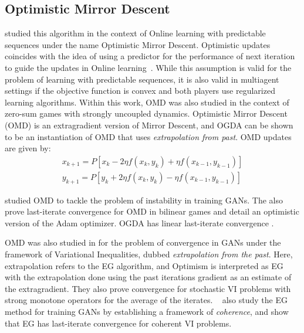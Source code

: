 \subsection{Optimistic Mirror Descent}
\cite{rakhlinOptimization2013} studied this algorithm in the context of Online learning with
predictable sequences under the name Optimistic Mirror Descent.
Optimistic updates coincides with the idea of using a predictor for the performance of next
iteration to guide the updates in Online learning~\cite{}.
While this assumption is valid for the problem of learning with predictable sequences, it is also
valid in multiagent settings if the objective function is convex and both players use regularized
learning algorithms.
Within this work, OMD was also studied in the context of zero-sum games with strongly uncoupled
dynamics.
Optimistic Mirror Descent (OMD) is an extragradient version of Mirror Descent, and OGDA can be
shown to be an instantiation of OMD that uses \textit{extrapolation from past}.
OMD updates are given by:
\begin{equation}
	\label{eqn:omd}
	\begin{split}
		x_{k+1} = P[x_k - 2\eta
				f(x_k, y_k) + \eta f(x_{k-1}, y_{k-1})] \\ y_{k+1} = P[y_k + 2\eta f(x_k, y_k) - \eta f(x_{k-1},
				y_{k-1})]
	\end{split}
\end{equation}

\cite{daskalakisTraining2018} studied OMD
to tackle the problem of instability in training GANs.
The also prove last-iterate convergence for OMD in bilinear games and detail an optimistic version
of the Adam optimizer.
OGDA has linear last-iterate convergence \cite{daskalakisTraining2018}.

OMD was also studied in \cite{gidelVariational2020} for the problem of convergence in GANs under
the framework of Variational Inequalities, dubbed \textit{extrapolation from the past}.
Here, extrapolation refers to the EG algorithm, and Optimism is interpreted as EG with the
extrapolation done using the past iterations gradient as an estimate of the extragradient.
They also prove convergence for stochastic VI problems with strong monotone operators for the
average of the iterates.
~\cite{mertikopoulosOptimistic2019} also study the EG method for training GANs by establishing a framework of
\textit{coherence}, and show that EG has last-iterate convergence for coherent VI problems.

